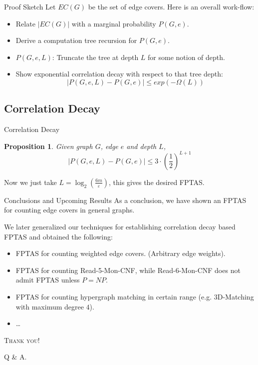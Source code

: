 \documentclass[mathserif]{beamer}
\newtheorem{proposition}[theorem]{Proposition}
\newcommand{\abs}[1]{\left\vert#1\right\vert}
\newcommand{\eps}{\varepsilon}
\begin{document}
\begin{frame}{Proof Sketch}
Let $EC(G)$ be the set of edge covers.
Here is an overall work-flow:
\begin{itemize}
  \item{Relate $\abs{EC(G)}$ with a marginal probability $P(G,e)$.}
  \item{Derive a computation tree recursion for $P(G,e)$.}
  \item{$P(G,e,L)$: Truncate the tree at depth $L$ for some notion of depth.}
  \item\alert{ Show exponential correlation decay with respect to that tree depth:
  \[
    \abs{ P(G,e,L) - P(G,e) } \leq exp(-\Omega(L))
  \]}
\end{itemize}
\end{frame}

\subsection{Correlation Decay}
\begin{frame}{Correlation Decay}

\begin{proposition}
	Given graph $G$, edge $e$ and depth $L$,
	\[\abs{P(G,e,L) - P(G,e)} \leq 3\cdot(\frac{1}{2})^{L+1}\]
\end{proposition}
    Now we just take $L = \log_2 \left(\frac{6m}{\eps} \right)$, this gives the desired FPTAS.
\end{frame}

\begin{frame}{Conclusions and Upcoming Results}
As a conclusion, we have shown an FPTAS for counting edge covers in general graphs.
\bigskip

	  \pause
We later generalized our techniques for establishing correlation decay based FPTAS and obtained the following:
\begin{itemize}
  \item FPTAS for counting weighted edge covers. (Arbitrary edge weights).
  \item FPTAS for counting Read-5-Mon-CNF, while Read-6-Mon-CNF does not admit FPTAS unless $P=NP$.
  \item FPTAS for counting hypergraph matching in certain range (e.g. $3$D-Matching with maximum degree $4$).
  \item \dots
\end{itemize}
\end{frame}
\begin{frame}
	\begin{center}
		\Huge \scshape Thank you!
	\end{center}

	\bigskip
	\begin{center}
		\huge Q \& A.
	\end{center}
\end{frame}
\end{document}
